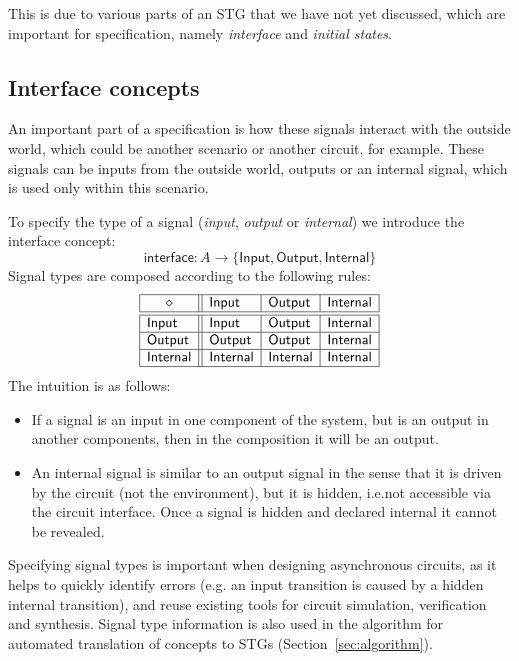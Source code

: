 \documentclass[british,conference,compsoc]{IEEEtran}
\begin{document}
This is due to various parts of an STG that we have not yet discussed, which are important
for specification, namely \emph{interface} and \emph{initial states}.


\subsection{Interface concepts \label{sub:interface}} 

An important part of a specification is how these signals interact with the outside world, which could
be another scenario or another circuit, for example. These signals can be inputs from the outside world,
outputs or an internal signal, which is used only within this scenario. 

To specify the type of a signal (\emph{input},
\emph{output} or \emph{internal}) we introduce the \textsf{interface} concept:
\[
\mathsf{interface} : A \rightarrow \{\mathsf{Input}, \mathsf{Output},
\mathsf{Internal}\}
\]
Signal types are composed according to the following rules:
\[
\begin{array}{|l||l|l|l|}
\hline
\multicolumn{1}{|c||}{\diamond} & \mathsf{Input} & \mathsf{Output} &
\mathsf{Internal} \\ \hline \hline
\mathsf{Input} & \mathsf{Input} & \mathsf{Output} & \mathsf{Internal} \\ \hline
\mathsf{Output} & \mathsf{Output} & \mathsf{Output} & \mathsf{Internal} \\
\hline
\mathsf{Internal}& \mathsf{Internal} & \mathsf{Internal} & \mathsf{Internal} \\
\hline
\end{array}
\]
The intuition is as follows:
\begin{itemize}
    \item If a signal is an input in one component of the system, but is an
    output in another components, then in the composition it will be an output.
    \item An internal signal is similar to an output signal in the sense
that it is driven by the circuit (not the environment), but it is hidden, i.e.not accessible via the circuit interface. Once a signal is hidden and declared    internal it cannot be revealed.
\end{itemize}

\noindent Specifying signal types is important when designing asynchronous
circuits, as it helps to quickly identify errors (e.g. an input transition is
caused by a hidden internal transition), and reuse existing tools for circuit
simulation, verification and synthesis. Signal type information is also used
in the algorithm for automated translation of concepts to
STGs (Section~\ref{sec:algorithm}).
\end{document}
